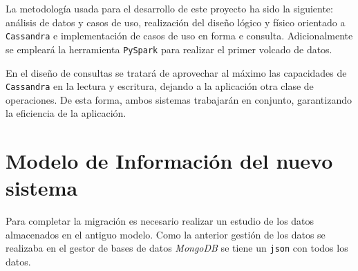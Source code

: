 \documentclass[]{article}
\begin{document}
La metodología usada para el desarrollo de este proyecto ha sido la siguiente:
análisis de datos y casos de uso, realización del diseño lógico y físico
orientado a \texttt{Cassandra} e implementación de casos de uso en forma e
consulta. Adicionalmente se empleará la herramienta \texttt{PySpark} para
realizar el primer volcado de datos.

En el diseño de consultas se tratará de aprovechar al máximo las capacidades de
\texttt{Cassandra} en la lectura y escritura, dejando a la aplicación otra clase de
operaciones. De esta forma, ambos sistemas trabajarán en conjunto, garantizando
la eficiencia de la aplicación.


% 

\section{Modelo de Información del nuevo sistema}
\label{sec:modelo_informacion}

Para completar la migración es necesario realizar un estudio de los datos almacenados en el antiguo modelo. Como la anterior gestión de los datos se realizaba en el gestor de bases de datos \textit{MongoDB} se tiene un \texttt{json} con todos los datos.
\end{document}
